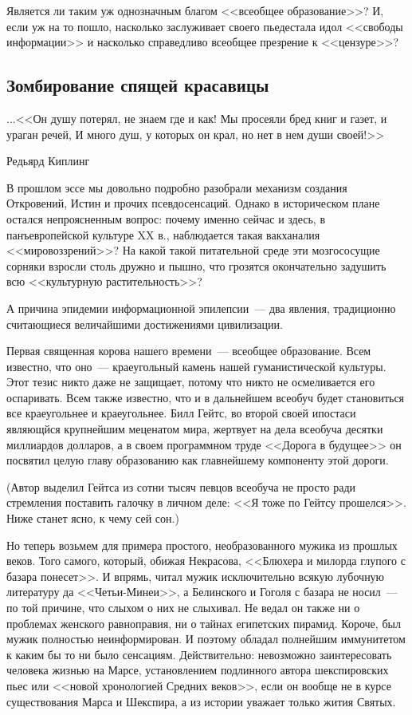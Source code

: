 \documentclass{scrbook}
\makeatletter
\newcommand{\defaultepigraphwidth}{0.5} %
\newcommand{\flqq}{<<}
\newcommand{\frqq}{>>}
\newcommand{\mdash}{~--- }
\newcommand{\essaysection}[1]{\subsection*{#1}\nopagebreak}
\newcommand{\myepigraph}[3][\@empty]{
	\ifx\@empty#1
		\setlength{\epigraphwidth}{\defaultepigraphwidth\textwidth}
	\else
		\setlength{\epigraphwidth}{#1\textwidth}
	\fi
	\epigraph{#2}{#3}
	\setlength{\epigraphwidth}{\defaultepigraphwidth\textwidth} %
	\nopagebreak
}
\makeatother
\begin{document}
Является ли таким уж однозначным благом {\flqq}всеобщее образование{\frqq}? И, если уж на то пошло, насколько заслуживает своего пьедестала идол {\flqq}свободы информации{\frqq} и насколько справедливо всеобщее презрение к {\flqq}цензуре{\frqq}?

\essaysection{Зомбирование спящей красавицы}

\myepigraph{...{\flqq}Он душу потерял, не знаем где и как! Мы просеяли бред книг и газет, и ураган речей, И много душ, у которых он крал, но нет в нем души своей!{\frqq}}
{Редьярд Киплинг}

В прошлом эссе мы довольно подробно разобрали механизм создания Откровений, Истин и прочих псевдосенсаций. Однако в историческом плане остался непроясненным вопрос: почему именно сейчас и здесь, в панъевропейской культуре XX в., наблюдается такая вакханалия {\flqq}мировоззрений{\frqq}? На какой такой питательной среде эти мозгососущие сорняки взросли столь дружно и пышно, что грозятся окончательно задушить всю {\flqq}культурную растительность{\frqq}?

А причина эпидемии информационной эпилепсии{\mdash}два явления, традиционно считающиеся величайшими достижениями цивилизации.

Первая священная корова нашего времени{\mdash}всеобщее образование. Всем известно, что оно{\mdash}краеугольный камень нашей гуманистической культуры. Этот тезис никто даже не защищает, потому что никто не осмеливается его оспаривать. Всем также известно, что и в дальнейшем всеобуч будет становиться все краеугольнее и краеугольнее. Билл Гейтс, во второй своей ипостаси являющйся крупнейшим меценатом мира, жертвует на дела всеобуча десятки миллиардов долларов, а в своем программном труде {\flqq}Дорога в будущее{\frqq} он посвятил целую главу образованию как главнейшему компоненту этой дороги.

(Автор выделил Гейтса из сотни тысяч певцов всеобуча не просто ради стремления поставить галочку в личном деле: {\flqq}Я тоже по Гейтсу прошелся{\frqq}. Ниже станет ясно, к чему сей сон.)

Но теперь возьмем для примера простого, необразованного мужика из прошлых веков. Того самого, который, обижая Некрасова, {\flqq}Блюхера и милорда глупого с базара понесет{\frqq}. И впрямь, читал мужик исключительно всякую лубочную литературу да {\flqq}Четьи-Минеи{\frqq}, а Белинского и Гоголя с базара не носил{\mdash}по той причине, что слыхом о них не слыхивал. Не ведал он также ни о проблемах женского равноправия, ни о тайнах египетских пирамид. Короче, был мужик полностью неинформирован. И поэтому обладал полнейшим иммунитетом к каким бы то ни было сенсациям. Действительно: невозможно заинтересовать человека жизнью на Марсе, установлением подлинного автора шекспировских пьес или {\flqq}новой хронологией Средних веков{\frqq}, если он вообще не в курсе существования Марса и Шекспира, а из истории уважает только жития Святых.
\end{document}
